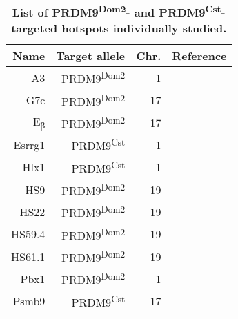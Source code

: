 \begin{table}[h]
    \centering
	\begin{adjustbox}{width = 1\textwidth}
    \begin{tabular}{rrrr}
        \toprule
        \textbf{Name} & \textbf{Target allele} & \textbf{Chr.} & \textbf{Reference} \\


        \midrule
        A3 & PRDM9\textsuperscript{Dom2} & 1 & \citet{kelmenson2005torrid, cole2010comprehensive} \\
        G7c & PRDM9\textsuperscript{Dom2} & 17 & \citet{snoek1998molecular} \\
        E\textsubscript{\textgreek{β}} & PRDM9\textsuperscript{Dom2} & 17 & \citet{steinmetz1982molecular} \\ %
        Esrrg1 & PRDM9\textsuperscript{Cst} & 1 & \citet{billings2013dna} \\
        Hlx1 & PRDM9\textsuperscript{Cst} & 1 & \citet{ng2008quantitative,billings2013dna} \\
        HS9 & PRDM9\textsuperscript{Dom2} & 19 & \citet{bois2007highly,getun2010nucleosome} \\%
        HS22 & PRDM9\textsuperscript{Dom2} & 19 & \citet{getun2010nucleosome} \\
        HS59.4 & PRDM9\textsuperscript{Dom2} & 19 & \citet{getun2010nucleosome} \\
        HS61.1 & PRDM9\textsuperscript{Dom2} & 19 & \citet{wu2010anatomy,getun2010nucleosome} \\
        Pbx1 & PRDM9\textsuperscript{Dom2} & 1 & \citet{billings2013dna,baker2015multimer} \\
        Psmb9 & PRDM9\textsuperscript{Cst} & 17 & \citet{guillon2002initiation,baudat2007cis} \\
        \bottomrule
    \end{tabular}
	\end{adjustbox}
    \caption[List of PRDM9\textsuperscript{Dom2}- and PRDM9\textsuperscript{Cst}-targeted hotspots individually studied]
    {\textbf{List of PRDM9\textsuperscript{Dom2}- and PRDM9\textsuperscript{Cst}-targeted hotspots individually studied.}
    }
\label{tab:hotspots-studied-sperm-typing}
\end{table}


